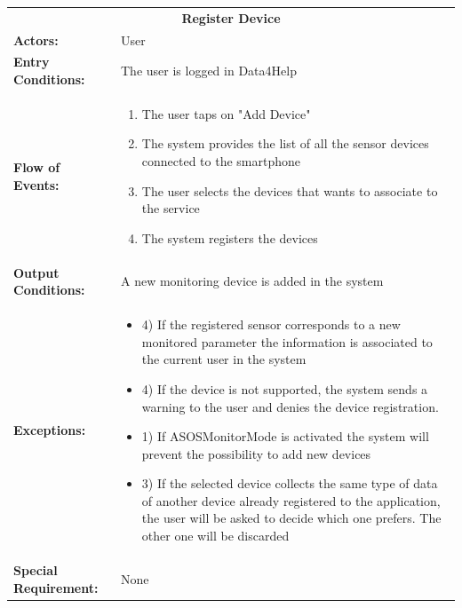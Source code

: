\begin{table}[htb]
	\centering
	{\renewcommand{\arraystretch}{1.5}%
		\begin{tabular}{|@{\hspace{2em}} p{4cm} @{}| p{11cm} @{\qquad}|}
			\cline{1-2}
			\multicolumn{2}{|c|}{\textbf{Register Device}} \\ \cline{1-2}
			\textbf{Actors:} & User \\ \cline{1-2}
			\textbf{Entry Conditions:} &  The user is logged in Data4Help \\ \cline{1-2}
			\textbf{Flow of Events:} &
			 \begin{enumerate}[itemsep=-0.2em, topsep=0em]
				\item The user taps on "Add Device"
				\item The system provides the list of all the sensor devices connected to the smartphone
				\item The user selects the devices that wants to associate to the service
				\item The system registers the devices
			\end{enumerate} \\ \cline{1-2}
			\textbf{Output Conditions:} & A new monitoring device is added in the system \\ \hline
			\textbf{Exceptions:} & 
			\begin{itemize}[itemsep=-0.2em, topsep=-2em, partopsep=-1em]
				\item 4) If the registered sensor corresponds to a new monitored parameter the information is associated to the current user in the system 
				\item 4) If the device is not supported, the system sends a warning to the user and denies the device registration.
				\item 1) If ASOSMonitorMode is activated the system will prevent the possibility to add new devices
				\item 3) If the selected device collects the same type of data of another device already registered to the application, the user will be asked to decide which one prefers. The other one will be discarded
			\end{itemize} \\ \cline{1-2}
			\textbf{Special Requirement:} & None \\ \hline
	\end{tabular}} \quad
\end{table}

